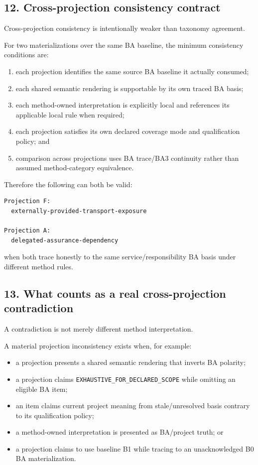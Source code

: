 \documentclass[11pt,a4paper]{article}
\providecommand{\tightlist}{\setlength{\itemsep}{0pt}\setlength{\parskip}{0pt}}
\begin{document}
\subsection{12. Cross-projection consistency
contract}\label{12-cross-projection-consistency-contract}

Cross-projection consistency is intentionally weaker than taxonomy
agreement.

For two materializations over the same BA baseline, the minimum
consistency conditions are:

\begin{enumerate}
\def\labelenumi{\arabic{enumi}.}
\tightlist
\item
  each projection identifies the same source BA baseline it actually
  consumed;
\item
  each shared semantic rendering is supportable by its own traced BA
  basis;
\item
  each method-owned interpretation is explicitly local and references
  its applicable local rule when required;
\item
  each projection satisfies its own declared coverage mode and
  qualification policy; and
\item
  comparison across projections uses BA trace/BA3 continuity rather than
  assumed method-category equivalence.
\end{enumerate}

Therefore the following can both be valid:

\begin{verbatim}
Projection F:
  externally-provided-transport-exposure

Projection A:
  delegated-assurance-dependency
\end{verbatim}

when both trace honestly to the same service/responsibility BA basis
under different method rules.

\subsection{13. What counts as a real cross-projection
contradiction}\label{13-what-counts-as-a-real-cross-projection-contradiction}

A contradiction is not merely different method interpretation.

A material projection inconsistency exists when, for example:

\begin{itemize}
\tightlist
\item
  a projection presents a shared semantic rendering that inverts BA
  polarity;
\item
  a projection claims \texttt{EXHAUSTIVE\_FOR\_DECLARED\_SCOPE} while
  omitting an eligible BA item;
\item
  an item claims current project meaning from stale/unresolved basis
  contrary to its qualification policy;
\item
  a method-owned interpretation is presented as BA/project truth; or
\item
  a projection claims to use baseline B1 while tracing to an
  unacknowledged B0 BA materialization.
\end{itemize}
\end{document}
